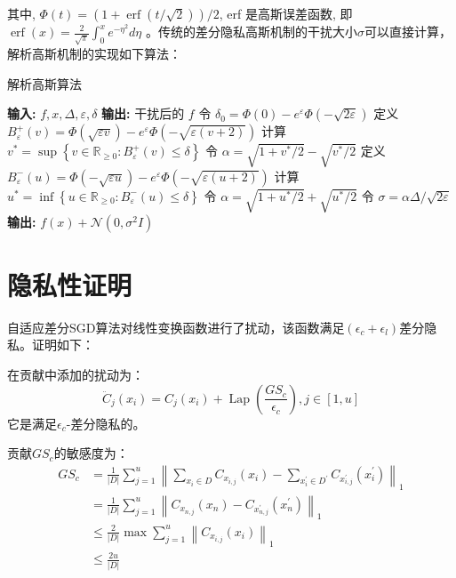 其中, $\Phi(t)=(1+\operatorname{erf}(t / \sqrt{2})) / 2$, erf 是高斯误差函数, 即 $\operatorname{erf}(x)=\frac{2}{\sqrt{\pi}} \int_{0}^{x} e^{-\eta^{2}} d \eta$ 。传统的差分隐私高斯机制的干扰大小$\sigma$可以直接计算，解析高斯机制的实现如下算法：

\begin{algorithm}[!htb]
	\caption{解析高斯算法}
	\label{解析高斯算法}
	\begin{algorithmic}[1]
		\footnotesize
		\STATE \textbf{输入:} $f, x, \Delta, \varepsilon, \delta$
		\STATE \textbf{输出:} 干扰后的 $f$
		\STATE 令 $\delta_{0}=\Phi(0)-e^{\varepsilon} \Phi(-\sqrt{2 \varepsilon})$
			\STATE 定义 $B_{\varepsilon}^{+}(v)=\Phi(\sqrt{\varepsilon v})-e^{\varepsilon} \Phi(-\sqrt{\varepsilon(v+2)})$
			\STATE 计算 $v^{*}=\sup \left\{v \in \mathbb{R}_{\geq 0}: B_{\varepsilon}^{+}(v) \leq \delta\right\}$
            \STATE 令 $\alpha=\sqrt{1+v^{*} / 2}-\sqrt{v^{*} / 2}$
        \ELSE
        	\STATE 定义 $B_{\varepsilon}^{-}(u)=\Phi(-\sqrt{\varepsilon u})-e^{\varepsilon} \Phi(-\sqrt{\varepsilon(u+2)})$
        	\STATE 计算 $u^{*}=\inf \left\{u \in \mathbb{R}_{\geq 0}: B_{\varepsilon}^{-}(u) \leq \delta\right\}$
        	\STATE 令 $\alpha=\sqrt{1+u^{*} / 2}+\sqrt{u^{*} / 2}$
        \ENDIF
    	\STATE 令 $\sigma=\alpha \Delta / \sqrt{2 \varepsilon}$
    	\STATE \textbf{输出:} $f(x)+\mathcal{N}\left(0, \sigma^{2} I\right)$
	\end{algorithmic}
\end{algorithm}


\section{隐私性证明}
自适应差分SGD算法对线性变换函数进行了扰动，该函数满足$\left(\epsilon_{c}+\epsilon_{l}\right)$差分隐私。证明如下：

在贡献中添加的扰动为：
\begin{equation}\label{eq:贡献中添加的噪声}
\ddot{C}_{j}\left(x_{i}\right)=C_{j}\left(x_{i}\right)+\operatorname{Lap}\left(\frac{G S_{c}}{\epsilon_{c}}\right), j \in[1, u]
\end{equation}
它是满足$\epsilon_{c}$-差分隐私的。

贡献$G S_{c}$的敏感度为：
\begin{equation}\label{eq:贡献敏感度}
\begin{aligned}
G S_{c} &=\frac{1}{|D|} \sum_{j=1}^{u}\left\|\sum_{x_{i} \in D} C_{x_{i, j}}\left(x_{i}\right)-\sum_{x_{i}^{\prime} \in D^{\prime}} C_{x_{i, j}^{\prime}}\left(x_{i}^{\prime}\right)\right\|_{1} \\
&=\frac{1}{|D|} \sum_{j=1}^{u}\left\|C_{x_{n, j}}\left(x_{n}\right)-C_{x_{n, j}^{\prime}}\left(x_{n}^{\prime}\right)\right\|_{1} \\
& \leq \frac{2}{|D|} \max \sum_{j=1}^{u}\left\|C_{x_{i, j}}\left(x_{i}\right)\right\|_{1} \\
& \leq \frac{2 u}{|D|}
\end{aligned}
\end{equation}

